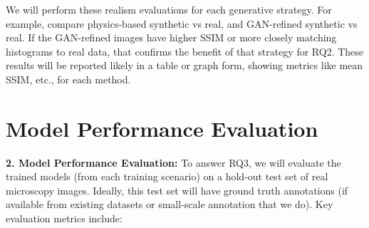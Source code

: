 \documentclass[
oneside,      %
openany       %
]{imc-inf}
\begin{document}
	
	We will perform these realism evaluations for each generative strategy. For example, compare physics-based synthetic vs real, and GAN-refined synthetic vs real. If the GAN-refined images have higher SSIM or more closely matching histograms to real data, that confirms the benefit of that strategy for RQ2. These results will be reported likely in a table or graph form, showing metrics like mean SSIM, etc., for each method.
	
	
	
	\section{Model Performance Evaluation}
	\textbf{2. Model Performance Evaluation:} To answer RQ3, we will evaluate the trained models (from each training scenario) on a hold-out test set of real microscopy images. Ideally, this test set will have ground truth annotations (if available from existing datasets or small-scale annotation that we do). Key evaluation metrics include:
	
\end{document}
